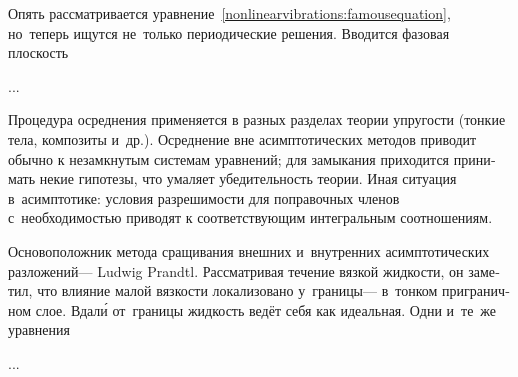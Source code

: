 


\begin{otherlanguage}{russian}

Опять рассматривается уравнение~\eqref{nonlinearvibrations:famousequation}, но~теперь ищутся не~только периодические решения.
Вводится фазовая плоскость

...

Процедура осреднения применяется в разных разделах теории упругости (тонкие тела, композиты и~др.).
Осреднение вне асимптотических методов приводит обычно к незамкнутым системам уравнений; для замыкания приходится принимать некие гипотезы, что умаляет убедительность теории.
Иная ситуация в~асимптотике: условия разрешимости для поправочных членов с~необходимостью приводят к соответствующим интегральным соотношениям.

\end{otherlanguage}



\begin{otherlanguage}{russian}

Основоположник метода сращивания внешних и~внутренних асимптотических разложений\:--- Ludwig Prandtl.
Рассматривая течение вязкой жидкости, он заметил, что влияние малой вязкости локализовано у~границы\:--- в~тонком приграничном слое.
Вдал\'{и} от~границы жидкость ведёт себя как идеальная.
Одни и~те~же уравнения

...



\end{otherlanguage}

